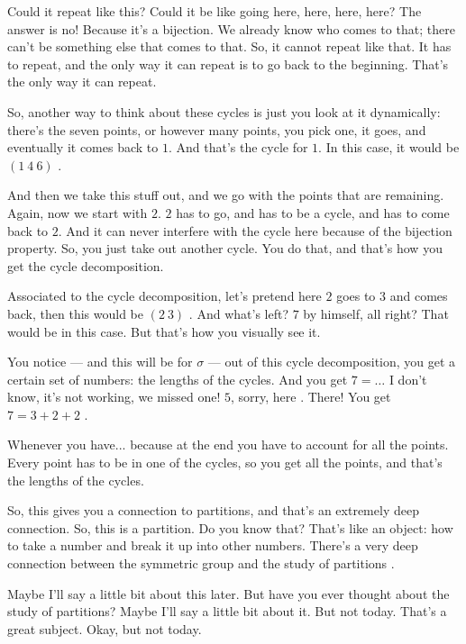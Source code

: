 \begin{speech}[00:30:52 - 00:32:32]
Could it repeat like this?  Could it be like going here, here, here, here? The answer is no! Because it's a bijection. We already know who comes to that; there can't be something else that comes to that. So, it cannot repeat like that. It has to repeat, and the only way it can repeat is to go back to the beginning. That's the only way it can repeat.

So, another way to think about these cycles is just you look at it dynamically: there's the seven points, or however many points, you pick one, it goes, and eventually it comes back to $1$. And that's the cycle for $1$. In this case, it would be $(1\ 4\ 6)$ .

And then we take this stuff out, and we go with the points that are remaining. Again, now we start with $2$. $2$ has to go, and has to be a cycle, and has to come back to $2$. And it can never interfere with the cycle here because of the bijection property. So, you just take out another cycle. You do that, and that's how you get the cycle decomposition.

Associated to the cycle decomposition, let's pretend here $2$ goes to $3$ and comes back, then this would be $(2\ 3)$ . And what's left? $7$ by himself, all right? That would be in this case. But that's how you visually see it.

You notice --- and this will be for $\sigma$ --- out of this cycle decomposition, you get a certain set of numbers: the lengths of the cycles. And you get $7 = \dots$ I don't know, it's not working, we missed one!  $5$, sorry, here . There! You get $7 = 3 + 2 + 2$ .

Whenever you have... because at the end you have to account for all the points. Every point has to be in one of the cycles, so you get all the points, and that's the lengths of the cycles.

So, this gives you a connection to partitions, and that's an extremely deep connection. So, this is a partition. Do you know that? That's like an object: how to take a number and break it up into other numbers. There's a very deep connection between the symmetric group and the study of partitions .

Maybe I'll say a little bit about this later. But have you ever thought about the study of partitions? Maybe I'll say a little bit about it. But not today. That's a great subject. Okay, but not today.
\end{speech}


